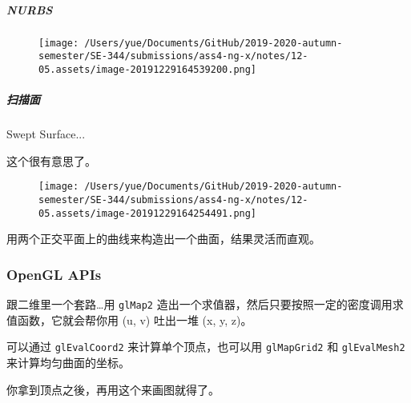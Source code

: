 \documentclass[
]{article}
\begin{document}
\hypertarget{header-n114}{%
\subparagraph{NURBS}\label{header-n114}}

\begin{figure}
\centering
\texttt{[image: /Users/yue/Documents/GitHub/2019-2020-autumn-semester/SE-344/submissions/ass4-ng-x/notes/12-05.assets/image-20191229164539200.png]}
\caption{}
\end{figure}

\hypertarget{header-n116}{%
\subparagraph{扫描面}\label{header-n116}}

Swept Surface...

这个很有意思了。

\begin{figure}
\centering
\texttt{[image: /Users/yue/Documents/GitHub/2019-2020-autumn-semester/SE-344/submissions/ass4-ng-x/notes/12-05.assets/image-20191229164254491.png]}
\caption{}
\end{figure}

用两个正交平面上的曲线来构造出一个曲面，结果灵活而直观。

\hypertarget{header-n121}{%
\subsubsection{OpenGL APIs}\label{header-n121}}

跟二维里一个套路\ldots 用 \texttt{glMap2}
造出一个求值器，然后只要按照一定的密度调用求值函数，它就会帮你用 (u, v)
吐出一堆 (x, y, z)。

可以通过 \texttt{glEvalCoord2} 来计算单个顶点，也可以用
\texttt{glMapGrid2} 和 \texttt{glEvalMesh2} 来计算均匀曲面的坐标。

你拿到顶点之後，再用这个来画图就得了。
\end{document}
